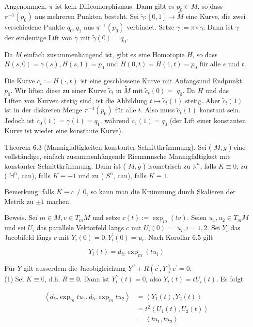 \documentclass[10pt, letterpaper]{article}
\begin{document}
Angenommen, $\pi$ ist kein Diffeomorphismus. Dann gibt es $p_{0} \in M$, so dass $\pi^{-1}\left(p_{0}\right)$ aus mehreren Punkten besteht. Sei $\tilde{\gamma}:[0,1] \rightarrow \tilde{M}$ eine Kurve, die zwei verschiedene Punkte $q_{0}, q_{1}$ aus $\pi^{-1}\left(p_{0}\right)$ verbindet. Setze $\gamma:=\pi \circ \tilde{\gamma}$. Dann ist $\tilde{\gamma}$ der eindeutige Lift von $\gamma$ mit $\tilde{\gamma}(0)=q_{0}$.

Da $M$ einfach zusammenhängend ist, gibt es eine Homotopie $H$, so dass $H(s, 0)=\gamma(s), H(s, 1)=p_{0}$ und $H(0, t)=H(1, t)=p_{0}$ für alle $s$ und $t$.

Die Kurve $c_{t}:=H(\cdot, t)$ ist eine geschlossene Kurve mit Anfangsund Endpunkt $p_{0}$. Wir liften diese zu einer Kurve $\tilde{c}_{t}$ in $\tilde{M}$ mit $\tilde{c}_{t}(0)=$ $q_{0}$. Da $H$ und das Liften von Kurven stetig sind, ist die Abbildung $t \mapsto \tilde{c}_{t}(1)$ stetig. Aber $\tilde{c}_{t}(1)$ ist in der diskreten Menge $\pi^{-1}\left(p_{0}\right)$ für alle $t$. Also muss $\tilde{c}_{t}(1)$ konstant sein. Jedoch ist $\tilde{c}_{0}(1)=\tilde{\gamma}(1)=q_{1}$, während $\tilde{c}_{1}(1)=q_{0}$ (der Lift einer konstanten Kurve ist wieder eine konstante Kurve).

Theorem 6.3 (Mannigfaltigkeiten konstanter Schnittkrümmung). Sei ( $M, g$ ) eine vollständige, einfach zusammenhängende Riemannsche Mannigfaltigkeit mit konstanter Schnittkrümmung. Dann ist ( $M, g$ ) isometrisch zu $\mathbb{R}^{n}$, falls $K \equiv 0$; zu ( $\mathbb{H}^{n}$, can), falls $K \equiv-1$ und zu ( $S^{n}$, can), falls $K \equiv 1$.

Bemerkung: falls $K \equiv c \neq 0$, so kann man die Krümmung durch Skalieren der Metrik zu $\pm 1$ machen.

Beweis. Sei $m \in M, v \in T_{m} M$ und setze $c(t):=\exp _{m}(t v)$. Seien $u_{1}, u_{2} \in T_{m} M$ und sei $U_{i}$ das parallele Vektorfeld längs $c$ mit $U_{i}(0)=$ $u_{i}, i=1,2$. Sei $Y_{i}$ das Jacobifeld längs $c$ mit $Y_{i}(0)=0, Y_{i}^{\prime}(0)=u_{i}$. Nach Korollar 6.5 gilt

$$
Y_{i}(t)=d_{t v} \exp _{m}\left(t u_{i}\right)
$$

Für $Y$ gilt ausserdem die Jacobigleichung $Y^{\prime \prime}+R\left(c^{\prime}, Y\right) c^{\prime}=0$.\\
(1) Sei $K \equiv 0$, d.h. $R \equiv 0$. Dann ist $Y_{i}^{\prime \prime}(t)=0$, also $Y_{i}(t)=t U_{i}(t)$. Es folgt

$$
\begin{aligned}
\left\langle d_{t v} \exp _{m} t u_{1}, d_{t v} \exp _{m} t u_{2}\right\rangle & =\left\langle Y_{1}(t), Y_{2}(t)\right\rangle \\
& =t^{2}\left\langle U_{1}(t), U_{2}(t)\right\rangle \\
& =\left\langle t u_{1}, t u_{2}\right\rangle
\end{aligned}
$$
\end{document}
